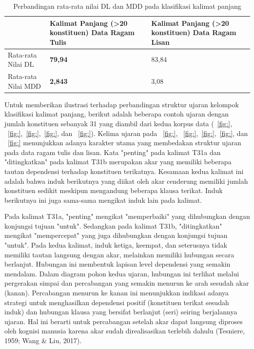 \begin{table}
\begin{center}
 \label{table:DL_MDD_panjang}
 \caption{Perbandingan rata-rata nilai DL dan MDD pada klasifikasi kalimat panjang}
\begin{tabular}{ |p{4cm} | p{4cm} | p{4cm} |}
    \hline
 & Kalimat Panjang \newline (\textgreater20 konstituen) \newline Data Ragam Tulis & Kalimat Panjang \newline (\textgreater20 konstituen) \newline Data Ragam Lisan \\ \hline
 Rata-rata Nilai DL & \textbf{79,94} & 83,84 \\ \hline
 Rata-rata Nilai MDD & \textbf{2,843} & 3,08 \\ \hline
   \end{tabular}
\end{center}
\end{table}

Untuk memberikan ilustrasi terhadap perbandingan struktur ujaran kelompok klasifikasi kalimat panjang, berikut adalah beberapa contoh ujaran dengan jumlah konstituen sebanyak 31 yang diambil dari kedua korpus data (\pic~\ref{fig:}, \pic~\ref{fig:},\pic~\ref{fig:},\pic~\ref{fig:}, dan \pic~\ref{fig:}). Kelima ujaran pada \pic~\ref{fig:}, \pic~\ref{fig:},\pic~\ref{fig:},\pic~\ref{fig:}, dan \pic~\ref{fig:} menunjukkan adanya karakter utama yang membedakan struktur ujaran pada data ragam tulis dan lisan. Kata "penting" pada kalimat T31a dan "ditingkatkan" pada kalimat T31b merupakan akar yang memiliki beberapa tautan dependensi terhadap konstituen terikatnya. Kesamaan kedua kalimat ini adalah bahwa induk berikutnya yang diikat oleh akar cenderung memiliki jumlah konstituen sedikit meskipun mengandung beberapa klausa terikat. Induk berikutnya ini juga sama-sama mengikat induk lain pada kalimat. 

Pada kalimat T31a, "penting" mengikat "memperbaiki" yang dihubungkan dengan konjungsi tujuan "untuk". Sedangkan pada kalimat T31b, "ditingkatkan" mengikat "mempercepat" yang juga dihubungkan dengan konjungsi tujuan "untuk". Pada kedua kalimat, induk ketiga, keempat, dan seterusnya tidak memiliki tautan langsung dengan akar, melainkan memiliki hubungan secara berlanjut. Hubungan ini membentuk lapisan level dependensi yang semakin mendalam. Dalam diagram pohon kedua ujaran, hubungan ini terlihat melalui pergerakan simpai dan percabangan yang semakin menurun ke arah sesudah akar (kanan). Percabangan menurun ke kanan ini menunjukkan indikasi adanya strategi untuk menghasilkan dependensi positif (konstituen terikat sesudah induk) dan hubungan klausa yang bersifat berlanjut (seri) seiring berjalannya ujaran. Hal ini berarti untuk percabangan setelah akar dapat langsung diproses oleh kognisi manusia karena akar sudah direalisasikan terlebih dahulu (Tesniere, 1959; Wang & Liu, 2017). 


